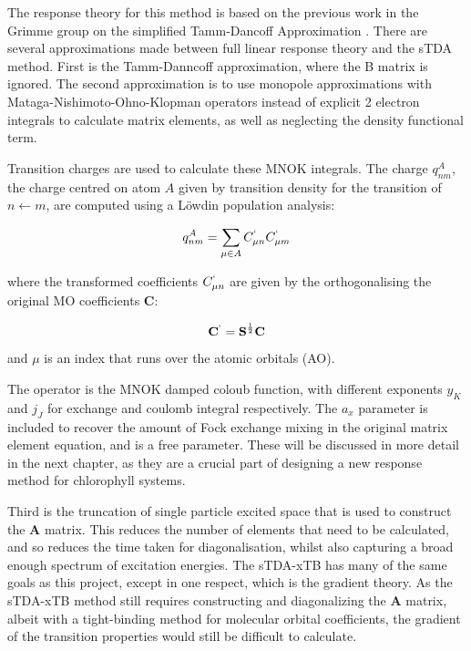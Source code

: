 The response theory for this method is based on the previous work in the Grimme 
group on the simplified Tamm-Dancoff Approximation \cite{Grimme2013}.
There are several approximations made between full linear response theory and
the sTDA method. First is the Tamm-Danncoff approximation, where the B matrix is ignored.
The second approximation is to use monopole approximations with Mataga-Nishimoto-Ohno-Klopman
operators instead of explicit 2 electron integrals to calculate matrix elements, as well as
neglecting the density functional term.

Transition charges are used to calculate these MNOK integrals. The charge $q^A_{nm}$,
the charge centred on atom $A$ given by transition density for the transition of
$ n \leftarrow m$, are computed using a Löwdin population analysis:

\begin{equation}
q_{nm}^A = \sum_{\mu \in A} C^`_{\mu n} C^`_{\mu m}
\end{equation}

where the transformed coefficients $C^`_{\mu n}$ are given by the orthogonalising
the original MO coefficients $\textbf{C}$:

\begin{equation}
\textbf{C}^` = \textbf{S}^{\frac{1}{2}} \textbf{C}
\end{equation}

and $\mu$ is an index that runs over the atomic orbitals (AO).

The operator is the 
MNOK\cite{Nishimoto1957}\cite{Ohno1964}\cite{Klopman1964} damped coloub function, 
with different exponents $y_K$ and $j_J$ for exchange and coulomb integral respectively. 
The $a_x$ parameter is included to recover the amount of Fock exchange mixing in
the original matrix element equation, and is a free parameter. These will be discussed
in more detail in the next chapter, as they are a crucial part of designing a new
response method for chlorophyll systems.

Third is the truncation of single particle excited space that is used to construct 
the $\mathbf{A}$ matrix. This reduces the number of elements that need to be 
calculated, and so reduces the time taken for diagonalisation, whilst also capturing 
a broad enough spectrum of excitation energies. The sTDA-xTB has many of the same 
goals as this project, except in one respect, which is the gradient theory. As 
the sTDA-xTB method still requires constructing and diagonalizing the $\mathbf{A}$ 
matrix, albeit with a tight-binding method for molecular orbital coefficients, 
the gradient of the transition properties would still be difficult to calculate.

